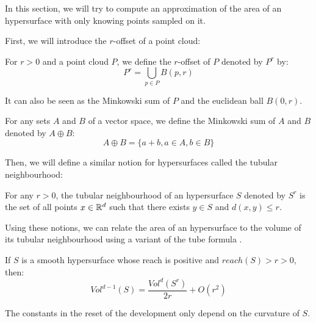 In this section, we will try to compute an approximation of the area of an
hypersurface with only knowing points sampled on it.

First, we will introduce the $r$-offset of a point cloud:

\begin{definition}
    For $ r > 0 $ and a point cloud $ P $, we define the $r$-offset of $ P $
    denoted by $ P^r $ by:
    $$ P^r = \bigcup_{p \in P} B(p, r)$$
\end{definition}

It can also be seen as the Minkowski sum of $ P $ and the euclidean ball $ B(0,
r) $.

\begin{definition}
    For any sets $ A $ and $ B $ of a vector space, we define the Minkowski sum
    of $ A $ and $ B $ denoted by $ A \oplus B $:
    $$ A \oplus B = \{ a + b, a \in A, b \in B \} $$
    \label{def:minkowski-sum}
\end{definition}

Then, we will define a similar notion for hypersurfaces called the tubular
neighbourhood:

\begin{definition}
    For any $ r > 0 $, the tubular neighbourhood of an hypersurface $ S $
    denoted by $ S^r $ is the set of all points $ x \in \mathbb{R}^d $ such that there
    exists $ y \in S $ and $ d(x, y) \leq r $.
\end{definition}

Using these notions, we can relate the area of an hypersurface to the volume of
its tubular neighbourhood using a variant of the tube formula \cite{weyl1939volume}.

\begin{proposition}
    \label{prop:comp-offset-area}
    If $ S $ is a smooth hypersurface whose reach is positive and $ reach(S) > r
    > 0 $, then: $$ Vol^{d-1}(S) = \frac{Vol^d(S^r)}{2r} + O(r^2) $$

    The constants in the reset of the development only depend on the curvature
    of $ S $.
\end{proposition}

